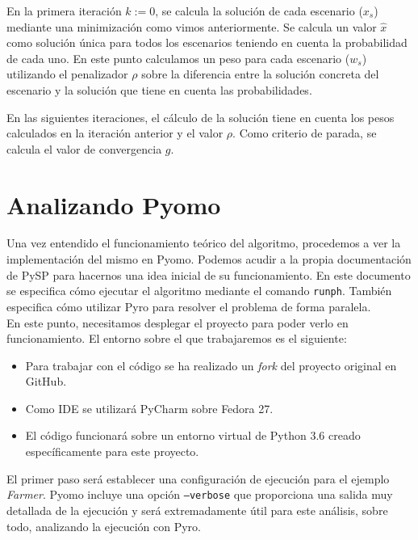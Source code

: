 En la primera iteración $k:=0$, se calcula la solución de cada escenario ($x_s$) mediante una minimización como vimos anteriormente. Se calcula un valor $\hat{x}$ como solución única para todos los escenarios teniendo en cuenta la probabilidad de cada uno. En este punto calculamos un peso para cada escenario ($w_s$) utilizando el penalizador $\rho$ sobre la diferencia entre la solución concreta del escenario y la solución que tiene en cuenta las probabilidades.

En las siguientes iteraciones, el cálculo de la solución tiene en cuenta los pesos calculados en la iteración anterior y el valor $\rho$. Como criterio de parada, se calcula el valor de convergencia $g$.

\section{Analizando Pyomo}


Una vez entendido el funcionamiento teórico del algoritmo, procedemos a ver la implementación del mismo en Pyomo. Podemos acudir a la propia documentación de PySP para hacernos una idea inicial de su funcionamiento. En este documento \cite{local_pyspdoc} se especifica cómo ejecutar el algoritmo mediante el comando \texttt{runph}. También especifica cómo utilizar Pyro para resolver el problema de forma paralela.\\

En este punto, necesitamos desplegar el proyecto para poder verlo en funcionamiento. El entorno sobre el que trabajaremos es el siguiente:

\begin{itemize}
    \item Para trabajar con el código se ha realizado un \textit{fork} del proyecto original en GitHub.
    \item Como IDE se utilizará PyCharm sobre Fedora 27.
    \item El código funcionará sobre un entorno virtual de Python 3.6 creado específicamente para este proyecto.
\end{itemize}

El primer paso será establecer una configuración de ejecución para el ejemplo \textit{Farmer}. Pyomo incluye una opción \texttt{--verbose} que proporciona una salida muy detallada de la ejecución y será extremadamente útil para este análisis, sobre todo, analizando la ejecución con Pyro.


